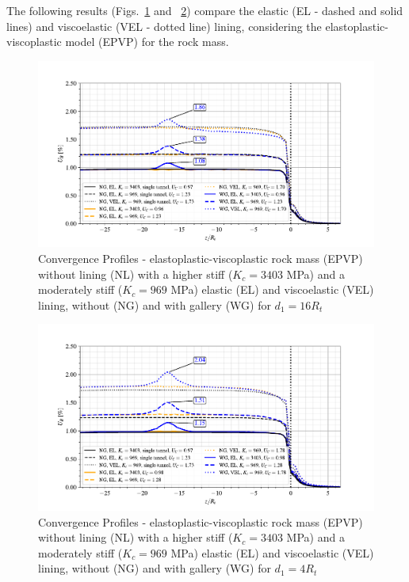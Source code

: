 \documentclass[a4paper,fleqn]{cas-sc}
\begin{document}
The following results (Figs.~\ref{EPVP_EL_VEL_d1_16Ri} and ~\ref{EPVP_EL_VEL_d1_4Ri}) compare the elastic (EL - dashed and solid lines) and viscoelastic (VEL - dotted line) lining, considering the elastoplastic-viscoplastic model (EPVP) for the rock mass. 
\begin{figure}[h!]
	\centering
	\includegraphics[scale=0.9]{Convergence Profiles - EPVP_EL_VEL_d1_16Ri_anotate.pdf}
	\caption{Convergence Profiles - elastoplastic-viscoplastic rock mass (EPVP) without lining (NL) with a higher stiff ($K_c = 3403$ MPa) and a moderately stiff ($K_c = 969$ MPa) elastic (EL) and viscoelastic (VEL) lining, without (NG) and with gallery (WG) for $d_1 = 16R_t$}
	\label{EPVP_EL_VEL_d1_16Ri}
\end{figure}
\FloatBarrier
\begin{figure}[h!]
	\centering
	\includegraphics[scale=0.9]{Convergence Profiles - EPVP_EL_VEL_d1_4Ri_anotate.pdf}
	\caption{Convergence Profiles - elastoplastic-viscoplastic rock mass (EPVP) without lining (NL) with a higher stiff ($K_c = 3403$ MPa) and a moderately stiff ($K_c = 969$ MPa) elastic (EL) and viscoelastic (VEL) lining, without (NG) and with gallery (WG) for $d_1 = 4R_t$}
	\label{EPVP_EL_VEL_d1_4Ri}
\end{figure}
\end{document}
